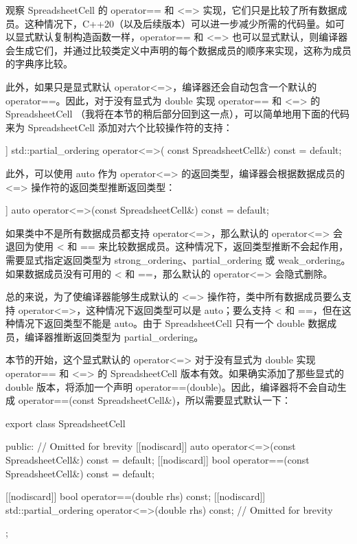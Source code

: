 
观察 SpreadsheetCell 的 operator== 和 <=> 实现，它们只是比较了所有数据成员。这种情况下，C++20（以及后续版本）可以进一步减少所需的代码量。如可以显式默认复制构造函数一样，operator== 和 <=> 也可以显式默认，则编译器会生成它们，并通过比较类定义中声明的每个数据成员的顺序来实现，这称为成员的字典序比较。

此外，如果只是显式默认 operator<=>，编译器还会自动包含一个默认的 operator==。因此，对于没有显式为 double 实现 operator== 和 <=> 的 SpreadsheetCell （我将在本节的稍后部分回到这一点），可以简单地用下面的代码来为 SpreadsheetCell 添加对六个比较操作符的支持：

\begin{cpp}
[[nodiscard]] std::partial_ordering operator<=>(
    const SpreadsheetCell&) const = default;
\end{cpp}

此外，可以使用 auto 作为 operator<=> 的返回类型，编译器会根据数据成员的 <=> 操作符的返回类型推断返回类型：

\begin{cpp}
[[nodiscard]] auto operator<=>(const SpreadsheetCell&) const = default;
\end{cpp}

如果类中不是所有数据成员都支持 operator<=>，那么默认的 operator<=> 会退回为使用 < 和 == 来比较数据成员。这种情况下，返回类型推断不会起作用，需要显式指定返回类型为 strong\_ordering、partial\_ordering 或 weak\_ordering。如果数据成员没有可用的 < 和 ==，那么默认的 operator<=> 会隐式删除。

总的来说，为了使编译器能够生成默认的 <=> 操作符，类中所有数据成员要么支持 operator<=>，这种情况下返回类型可以是 auto；要么支持 < 和 ==，但在这种情况下返回类型不能是 auto。由于 SpreadsheetCell 只有一个 double 数据成员，编译器推断返回类型为 partial\_ordering。

本节的开始，这个显式默认的 operator<=> 对于没有显式为 double 实现 operator== 和 <=> 的 SpreadsheetCell 版本有效。如果确实添加了那些显式的 double 版本，将添加一个声明 operator==(double)。因此，编译器将不会自动生成 operator==(const SpreadsheetCell\&)，所以需要显式默认一下：

\begin{cpp}
export class SpreadsheetCell
{
    public:
        // Omitted for brevity
        [[nodiscard]] auto operator<=>(const SpreadsheetCell&) const = default;
        [[nodiscard]] bool operator==(const SpreadsheetCell&) const = default;

        [[nodiscard]] bool operator==(double rhs) const;
        [[nodiscard]] std::partial_ordering operator<=>(double rhs) const;
        // Omitted for brevity
};
\end{cpp}

